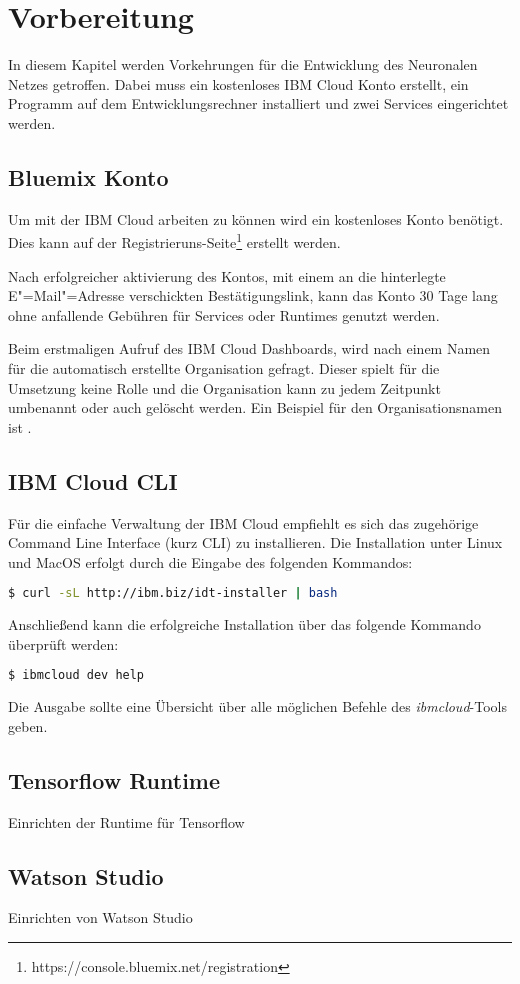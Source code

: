 \section{Vorbereitung}
In diesem Kapitel werden Vorkehrungen für die Entwicklung des Neuronalen Netzes getroffen. Dabei muss ein kostenloses IBM
Cloud Konto erstellt, ein Programm auf dem Entwicklungsrechner installiert und zwei Services eingerichtet werden.

\subsection{Bluemix Konto}
Um mit der IBM Cloud arbeiten zu können wird ein kostenloses Konto benötigt. Dies kann auf der
Registrieruns-Seite\footnote{https://console.bluemix.net/registration} erstellt werden.

Nach erfolgreicher aktivierung des Kontos, mit einem an die hinterlegte E"=Mail"=Adresse verschickten Bestätigungslink,
kann das Konto 30 Tage lang ohne anfallende Gebühren für Services oder Runtimes genutzt werden.

Beim erstmaligen Aufruf des IBM Cloud Dashboards, wird nach einem Namen für die automatisch erstellte Organisation gefragt.
Dieser spielt für die Umsetzung keine Rolle und die Organisation kann zu jedem Zeitpunkt umbenannt oder auch gelöscht werden.
Ein Beispiel für den Organisationsnamen ist .

\subsection{IBM Cloud CLI}
Für die einfache Verwaltung der IBM Cloud empfiehlt es sich das zugehörige Command Line Interface (kurz CLI) zu installieren.
Die Installation unter Linux und MacOS erfolgt durch die Eingabe des folgenden Kommandos:

\begin{lstlisting}[language=bash, caption=Installation des IBM Cloud CLI, label=Installation des IBM Cloud CLI]
    $ curl -sL http://ibm.biz/idt-installer | bash
\end{lstlisting}

Anschließend kann die erfolgreiche Installation über das folgende Kommando überprüft werden:

\begin{lstlisting}[language=bash, caption=Installation des CLI überprüfen, label=Installation des CLI überprüfen]
    $ ibmcloud dev help
\end{lstlisting}

Die Ausgabe sollte eine Übersicht über alle möglichen Befehle des \textit{ibmcloud}-Tools geben.

\subsection{Tensorflow Runtime}
Einrichten der Runtime für Tensorflow

\subsection{Watson Studio}
Einrichten von Watson Studio